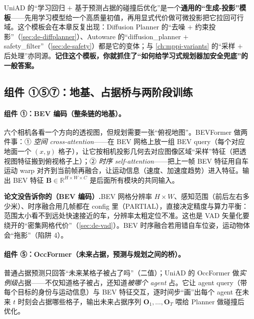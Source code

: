 \begin{insight}
UniAD 的“学习回归 $+$ 基于预测占据的碰撞后优化”是一个\textbf{通用的“生成-投影”模板}——先用学习模型给一个高质量初值，再用显式代价做可微投影把它拉回可行域。这个模板会在本章反复出现：Diffusion Planner 的“去噪 $+$ 约束投影”（\cref{sec:de-diffplanner}）、Autoware 的“diffusion\_planner $+$ safety\_filter”（\cref{sec:de-safety}）都是它的变体；与 \cref{ch:mppi-variants} 的“采样 $+$ 后处理”亦同源。\textbf{记住这个模板，你就抓住了“如何给学习式规划器加安全兜底”的一般答案。}
\end{insight}

\subsection{组件 ①⑤⑦：地基、占据桥与两阶段训练}
\label{sec:de-uniad-rest}

\paragraph{组件 ①：BEV 编码（整条链的地基）。}
六个相机各看一个方向的透视图，但规划需要一张“俯视地图”。BEVFormer 做两件事：① \emph{空间 cross-attention}——在 BEV 网格上放一组 BEV query（每个对应地面一个 $(x,y)$ 格子），让它按相机投影几何去对应图像区域“采样”特征（把透视图特征搬到俯视格子上）；② \emph{时序 self-attention}——把上一帧 BEV 特征用自车运动 warp 对齐到当前帧再融合，让运动信息（速度、加速度趋势）进入特征。输出 BEV 特征 $\mathbf{B}\in\mathbb{R}^{H\times W\times C}$ 是后面所有模块的共同输入。

\begin{note}
\textbf{论文没告诉你的（BEV 编码）.}\;BEV 网格分辨率 $H\times W$、感知范围（前后左右多少米）、时序融合用几帧都在 config 里（PARTIAL），直接决定精度与算力平衡：范围太小看不到远处快速接近的车，分辨率太粗定位不准。这也是 VAD 矢量化要绕开的“密集网格代价”（\cref{sec:de-vad}）。BEV 时序融合若用错自车位姿，运动物体会“拖影”（陷阱 4）。
\end{note}

\paragraph{组件 ⑤：OccFormer（未来占据，预测与规划之间的桥）。}
普通占据预测只回答“未来某格子被占了吗”（二值）；UniAD 的 OccFormer 做\emph{实例级}占据——不仅知道格子被占，还知道\emph{被哪个 agent} 占。它让 agent query（带每个目标的身份与运动信息）与 BEV 特征交互，逐时间步“画”出每个 agent 在未来 $t$ 时刻会占据哪些格子，输出未来占据序列 $\mathbf{O}_1,\dots,\mathbf{O}_T$ 喂给 Planner 做碰撞后优化。

